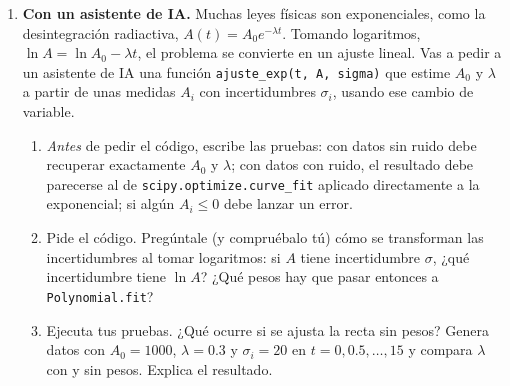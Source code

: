 \begin{enumerate}
\item \label{ej:exp_ia} \textbf{Con un asistente de IA.} Muchas leyes físicas son exponenciales, como la desintegración radiactiva, $A(t)=A_0e^{-\lambda t}$. Tomando logaritmos, $\ln A=\ln A_0-\lambda t$, el problema se convierte en un ajuste lineal. Vas a pedir a un asistente de IA una función \texttt{ajuste\_exp(t, A, sigma)} que estime $A_0$ y $\lambda$ a partir de unas medidas $A_i$ con incertidumbres $\sigma_i$, usando ese cambio de variable.
\begin{enumerate}
\item \emph{Antes} de pedir el código, escribe las pruebas: con datos sin ruido debe recuperar exactamente $A_0$ y $\lambda$; con datos con ruido, el resultado debe parecerse al de \texttt{scipy.optimize.curve\_fit} aplicado directamente a la exponencial; si algún $A_i\leq 0$ debe lanzar un error.
\item Pide el código. Pregúntale (y compruébalo tú) cómo se transforman las incertidumbres al tomar logaritmos: si $A$ tiene incertidumbre $\sigma$, ¿qué incertidumbre tiene $\ln A$? ¿Qué pesos hay que pasar entonces a \texttt{Polynomial.fit}?
\item Ejecuta tus pruebas. ¿Qué ocurre si se ajusta la recta sin pesos? Genera datos con $A_0=1000$, $\lambda=0.3$ y $\sigma_i=20$ en $t=0,0.5,\dots,15$ y compara $\lambda$ con y sin pesos. Explica el resultado.
\end{enumerate}
\end{enumerate}

